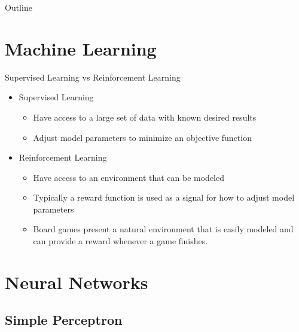 


\begin{frame}[plain] 
\titlepage
\end{frame}

\begin{frame}[plain]{Outline}
\tableofcontents
\end{frame}

\section{Machine Learning}

\begin{frame}[plain]{Supervised Learning vs Reinforcement Learning}
\begin{itemize}
\item Supervised Learning
\begin{itemize}
\item Have access to a large set of data with known desired results
\item Adjust model parameters to minimize an objective function
\end{itemize}
\item Reinforcement Learning
\begin{itemize}
\item Have access to an environment that can be modeled
\item Typically a reward function is used as a signal for how to adjust model parameters
\item Board games present a natural environment that is easily modeled and can provide a reward whenever a game finishes.
\end{itemize}
\end{itemize}
\end{frame}

\section{Neural Networks}
\subsection{Simple Perceptron}


